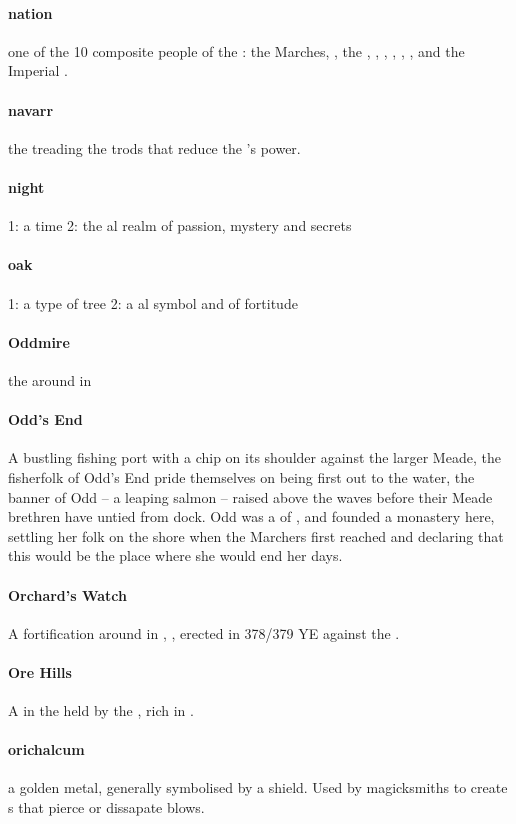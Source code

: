\paragraph{nation} one of the 10 composite people of the : the Marches, , the , , , , , ,  and the Im\-pe\-ri\-al .
\paragraph{navarr} the  treading the trods that reduce the 's power.
\paragraph{night} 1: a time 2: the al realm of passion, mystery and secrets
\paragraph{oak} 1: a type of tree 2: a al symbol and  of fortitude
\paragraph{Oddmire} the  around  in 
\paragraph{Odd's End} A bustling fishing port with a chip on its shoulder against the larger Meade, the fisherfolk of Odd's End pride themselves on being first out to the water, the banner of Odd – a leaping salmon – raised above the waves before their Meade brethren have untied from dock. Odd was a  of , and founded a monastery here, settling her folk on the shore when the Marchers first reached  and declaring that this would be the place where she would end her days. 
\paragraph{Orchard's Watch} A fortification around  in , , erected in 378/379 YE against the .
\paragraph{Ore Hills} A  in the  held by the , rich in .
\paragraph{orichalcum} a golden metal, generally symbolised by a shield. Used by magicksmiths to create s that pierce or dissapate blows.
